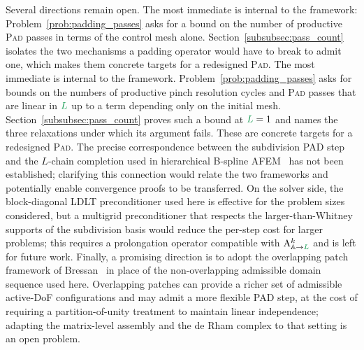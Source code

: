 \documentclass[a4paper, 12pt]{article}
\newcommand{\robert}[1]{{\color{orange} #1}}
\newcommand{\guidance}[1]{{\color{lime!70!black} #1}}
\newcommand{\green}{\color{ForestGreen}}
\renewcommand{\L}{{\green L}}
\newcommand{\Amat}[3]{\mathbf{\mathrm{A}}^{#1}_{#2 \to #3}}
\newcommand{\activeDoFs}{\mathbb{A}}
\theoremstyle{definition}
\theoremstyle{plain}
\numberwithin{equation}{section}
\newcommand{\tobecut}[1]{{\color{red} #1}}     %
\begin{document}
{Several directions remain open. \guidance{\tobecut{The most immediate is internal to the framework: Problem~\ref{prob:padding_passes} asks for a bound on the number of productive \textsc{Pad} passes in terms of the control mesh alone. Section~\ref{subsubsec:pass_count} isolates the two mechanisms a padding operator would have to break to admit one, which makes them concrete targets for a redesigned \textsc{Pad}.} \robert{The most immediate is internal to the framework. Problem~\ref{prob:padding_passes} asks for bounds on the numbers of productive pinch resolution cycles and \textsc{Pad} passes that are linear in $\L$ up to a term depending only on the initial mesh. Section~\ref{subsubsec:pass_count} proves such a bound at $\L = 1$ and names the three relaxations under which its argument fails. These are concrete targets for a redesigned \textsc{Pad}.}} The precise correspondence between the subdivision PAD step and the $L$-chain completion used in hierarchical B-spline AFEM~\cite{Cabanas.2026} has not been established; clarifying this connection would relate the two frameworks and potentially enable convergence proofs to be transferred. On the solver side, the block-diagonal LDLT preconditioner used here is effective for the problem sizes considered, but a multigrid preconditioner that respects the larger-than-Whitney supports of the subdivision basis would reduce the per-step cost for larger problems; this requires a prolongation operator compatible with $\Amat{k}{\activeDoFs}{\L}$ and is left for future work. Finally, a promising direction is to adopt the overlapping patch framework of Bressan~\cite{Bressan.2024} in place of the non-overlapping admissible domain sequence used here. Overlapping patches can provide a richer set of admissible active-DoF configurations and may admit a more flexible PAD step, at the cost of requiring a partition-of-unity treatment to maintain linear independence; adapting the matrix-level assembly and the de Rham complex to that setting is an open problem.}


\end{document}
